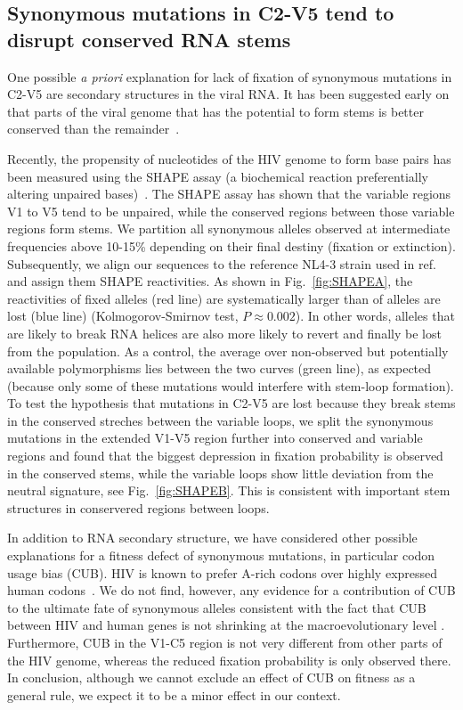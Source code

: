 \documentclass[rmp, twocolumn]{revtex4}
\newcommand{\FIG}[1]{Fig.~\ref{fig:#1}}
\begin{document}
\subsection{Synonymous mutations in C2-V5 tend to disrupt conserved RNA stems}
One possible {\it a priori} explanation for lack of fixation of synonymous
mutations in C2-V5 are  secondary structures in the viral RNA. It has
been suggested early on that parts of the viral genome that has the potential to
form stems is better conserved than the
remainder~\citep{forsdyke_reciprocal_1995,snoeck_mapping_2011}.

Recently, the propensity of nucleotides of the HIV genome to form base pairs has
been measured using the SHAPE assay (a biochemical reaction preferentially
altering unpaired bases)~\citep{watts_architecture_2009}. The SHAPE assay has
shown that the variable regions V1 to V5 tend to be unpaired, while the
conserved regions between those variable regions form stems. We partition all
synonymous alleles observed at intermediate frequencies above 10-15\% depending
on their final destiny (fixation or extinction). Subsequently, we align our
sequences to the reference NL4-3 strain used in
ref.~\citep{watts_architecture_2009} and assign them SHAPE reactivities. As
shown in \FIG{SHAPEA}, the reactivities of fixed
alleles (red line) are systematically larger than of alleles are lost (blue
line) (Kolmogorov-Smirnov test, $P\approx 0.002$).
In other words, alleles that are likely to break RNA helices are also more
likely to revert and finally be lost from the population. As a control, the
average over non-observed but potentially available polymorphisms lies between
the two curves (green line), as expected (because only some of these mutations
would interfere with stem-loop formation).
To test the hypothesis that mutations in C2-V5 are lost because they break stems in the
conserved streches between the variable loops, we split the synonymous mutations in the
extended V1-V5 region further into conserved and variable regions and found that
the biggest depression in fixation probability is observed in the conserved
stems, while the variable loops show little deviation from the neutral
signature, see \FIG{SHAPEB}. This is consistent with important stem structures
in conservered regions between loops.

In addition to RNA secondary structure, we have considered other possible
explanations for a fitness defect of synonymous mutations, in particular codon
usage bias (CUB). HIV is known to prefer A-rich codons over highly expressed
human codons~\citep{jenkins_extent_2003,kuyl_biased_2012}. We do not find,
however, any evidence for a contribution of CUB to the ultimate fate of
synonymous alleles consistent with the fact that CUB between HIV and human genes
is not shrinking at the macroevolutionary level \citep{kuyl_biased_2012}. 
Furthermore, CUB in the V1-C5 region is not very different from other parts of
the HIV genome, whereas the reduced fixation probability is only observed there. In
conclusion, although we cannot exclude an effect of CUB on fitness as a general
rule, we expect it to be a minor effect in our context. 
\end{document}
